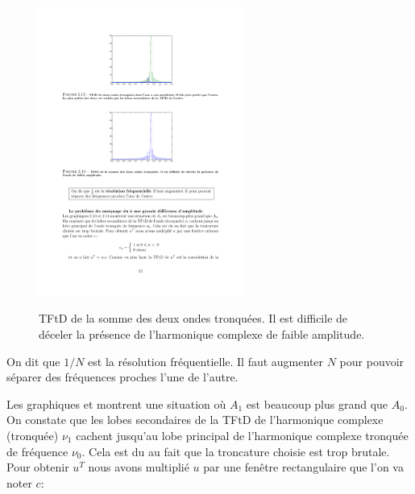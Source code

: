 \begin{definition}
\begin{figure}
  \centering
  \includegraphics[width=0.6\textwidth]{Figures/Figure2-14}\\
  \caption{TFtD de la somme des deux ondes tronqu\'{e}es. Il est difficile de d\'{e}celer la pr\'{e}sence de l'harmonique complexe de faible amplitude.}\label{fig:figure2-14}
\end{figure}

On dit que $1/N$ est la r\'{e}solution fr\'{e}quentielle. Il faut augmenter $N$ pour pouvoir s\'{e}parer des fr\'{e}quences proches l'une de l'autre.


Les graphiques  et  montrent une situation o\`{u} $A_{1}$ est beaucoup plus grand que $A_{0}$. On constate que les lobes secondaires de la TFtD de l'harmonique complexe (tronqu\'{e}e) $\nu_{1}$ cachent jusqu'au lobe principal de l'harmonique complexe tronqu\'{e}e de fr\'{e}quence $\nu_{0}$. Cela est du au fait que la troncature choisie est trop brutale. Pour obtenir $u^{T}$ nous avons multipli\'{e} $u$ par une fen\^{e}tre rectangulaire que l'on va noter $c$:


\end{definition}
